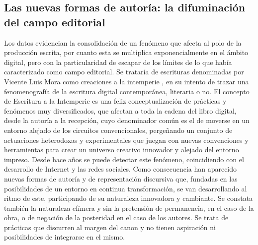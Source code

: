 \documentclass[spanish]{textolivre}
\begin{document}
\subsection{Las nuevas formas de autoría: la difuminación del campo editorial}\label{sec-fmt-manuscrito}
Los datos evidencian la consolidación de un fenómeno que afecta al polo de la producción escrita, por cuanto esta se multiplica exponencialmente en el ámbito digital, pero con la particularidad de escapar de los límites de lo que \textcite{bourdieu_reglas_2018} había caracterizado como campo editorial. Se trataría de escrituras denominadas por Vicente Luis Mora como creaciones a la intemperie \cite{mora_escritura_2021}, en su intento de trazar una fenomenografía de la escritura digital contemporánea, literaria o no. El concepto de Escritura a la Intemperie es una feliz conceptualización de prácticas y fenómenos muy diversificados, que afectan a toda la cadena del libro digital, desde la autoría a la recepción, cuyo denominador común es el de moverse en un entorno alejado de los circuitos convencionales, pergeñando un conjunto de actuaciones heterodoxas y experimentales que juegan con nuevas convenciones y herramientas para crear un universo creativo innovador y alejado del entorno impreso. Desde hace años se puede detectar este fenómeno, coincidiendo con el desarrollo de Internet y las redes sociales.  Como consecuencia han aparecido nuevas formas de autoría y de representación discursiva que, fundadas en las posibilidades de un entorno en continua transformación, se van desarrollando al ritmo de este, participando de su naturaleza innovadora y cambiante. Se constata también la naturaleza efímera y sin la pretensión de permanencia, en el caso de la obra, o de negación de la posteridad en el caso de los autores. Se trata de prácticas que discurren al margen del canon y no tienen aspiración ni posibilidades de integrarse en el mismo.
\end{document}
